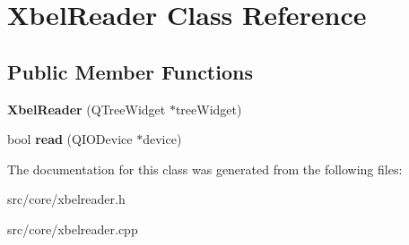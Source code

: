 \hypertarget{classXbelReader}{
\section{XbelReader Class Reference}
\label{classXbelReader}
}
\subsection*{Public Member Functions}
\begin{DoxyCompactItemize}
\item 
\hypertarget{classXbelReader_a9f4c1c3fa790794587f642662f890bdd}{
{\bfseries XbelReader} (QTreeWidget $\ast$treeWidget)}
\label{classXbelReader_a9f4c1c3fa790794587f642662f890bdd}

\item 
\hypertarget{classXbelReader_a94e5058a493d4bac02abdc55022eb454}{
bool {\bfseries read} (QIODevice $\ast$device)}
\label{classXbelReader_a94e5058a493d4bac02abdc55022eb454}

\end{DoxyCompactItemize}


The documentation for this class was generated from the following files:\begin{DoxyCompactItemize}
\item 
src/core/xbelreader.h\item 
src/core/xbelreader.cpp\end{DoxyCompactItemize}
